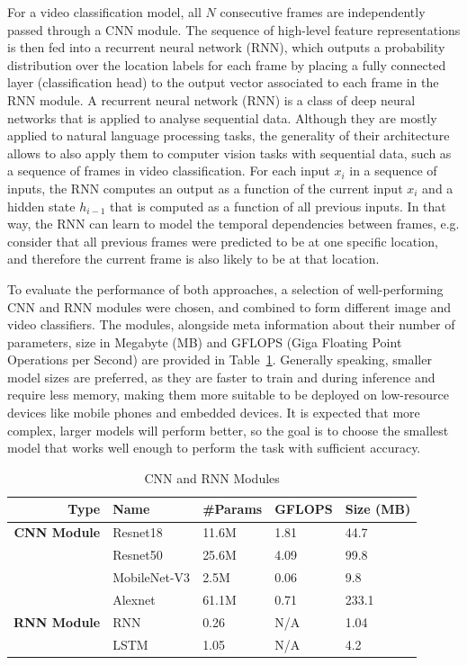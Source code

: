 \documentclass[a4paper]{article}
\begin{document}
  For a video classification model, all $N$ consecutive frames are independently
  passed through a CNN module. The sequence of high-level feature
  representations is then fed into a recurrent neural network (RNN), which
  outputs a probability distribution over the location labels for each frame by
  placing a fully connected layer (classification head) to the output vector
  associated to each frame in the RNN module. A recurrent neural network (RNN)
  is a class of deep neural networks that is applied to analyse sequential data.
  Although they are mostly applied to natural language processing tasks, the
  generality of their architecture allows to also apply them to computer vision
  tasks with sequential data, such as a sequence of frames in video
  classification. For each input $x_i$ in a sequence of inputs, the RNN computes
  an output as a function of the current input $x_i$ and a hidden state
  $h_{i-1}$ that is computed as a function of all previous inputs. In that way,
  the RNN can learn to model the temporal dependencies between frames, e.g.
  consider that all previous frames were predicted to be at one specific
  location, and therefore the current frame is also likely to be at that
  location.

  To evaluate the performance of both approaches, a selection of well-performing
  CNN and RNN modules were chosen, and combined to form different image and
  video classifiers. The modules, alongside meta information about their number
  of parameters, size in Megabyte (MB) and GFLOPS (Giga Floating Point
  Operations per Second) are provided in Table~\ref{tab:modules}. Generally
  speaking, smaller model sizes are preferred, as they are faster to train and
  during inference and require less memory, making them more suitable to be
  deployed on low-resource devices like mobile phones and embedded devices. It
  is expected that more complex, larger models will perform better, so the goal
  is to choose the smallest model that works well enough to perform the task
  with sufficient accuracy.

  \begin{table}[ht]
    \centering
    \begin{tabular}{rllll}
      \toprule
      Type & Name & \#Params & GFLOPS & Size (MB) \\
      \midrule
      \textbf{CNN Module} & Resnet18~\cite{resnet} & 11.6M & 1.81 & 44.7 \\
                          & Resnet50~\cite{resnet} & 25.6M & 4.09 & 99.8 \\
                          & MobileNet-V3 & 2.5M & 0.06 & 9.8 \\
                          & Alexnet & 61.1M & 0.71 & 233.1 \\
      \midrule
      \textbf{RNN Module} & RNN & 0.26 & N/A & 1.04 \\
                          & LSTM & 1.05 & N/A & 4.2 \\
      \bottomrule
    \end{tabular}
    \caption{CNN and RNN Modules}
    \label{tab:modules}
  \end{table}
\end{document}
